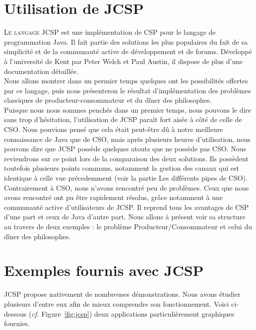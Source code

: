 \documentclass[a4paper,11pt,french]{report}
\begin{document}
\section{Utilisation de JCSP}

\lettrine{L}{e langage} JCSP est une implémentation de CSP pour le langage de programmation Java. Il fait partie des solutions les plus populaires du fait de sa simplicité et de la communauté active de développement et de forums. Développé à l'université de Kent par Peter Welch et Paul Austin, il dispose de plus d'une documentation détaillée.\\

Nous allons montrer dans un permier temps quelques ont les possibilités offertes par ce langage, puis nous présenteron le résultat d'implémentation des problèmes classiques de producteur-consommateur et du dîner des philosophes.\\

Puisque nous nous sommes penchés dans un premier temps, nous pouvons le dire sans trop d'hésitation, l'utilisation de JCSP paraît fort aisée à côté de celle de CSO. Nous pouvions pensé que cela était peut-être dû à notre meilleure connaissance de Java que de CSO, mais après plusieurs heures d'utilisation, nous pouvons dire que JCSP possède quelques atouts que ne possède pas CSO. Nous reviendrons sur ce point lors de la comparaison des deux solutions.
Ils possèdent toutefois plusieurs points communs, notamment la gestion des canaux qui est identique à celle vue précedemment (voir la partie Les différents pipes de CSO).
Contrairement à CSO, nous n'avons rencontré peu de problèmes. Ceux que nous avons rencontré ont pu être rapidement résolus, grâce notamment à une communauté active d'utilisateurs de JCSP. Il reprend tous les avantages de CSP d'une part et ceux de Java d'autre part. Nous allons à présent voir sa structure au travers de deux exemples : le problème Producteur/Consommateur et celui du dîner des philosophes.

\section{Exemples fournis avec JCSP}

JCSP propose nativement de nombreuses démonstrations. Nous avons étudier plusieurs d'entre eux afin de mieux comprendre son fonctionnement. Voici ci-dessous (\emph{cf.} Figure~\vref{fig:jcsp}) deux applications particulièrement graphiques fournies.
\end{document}
